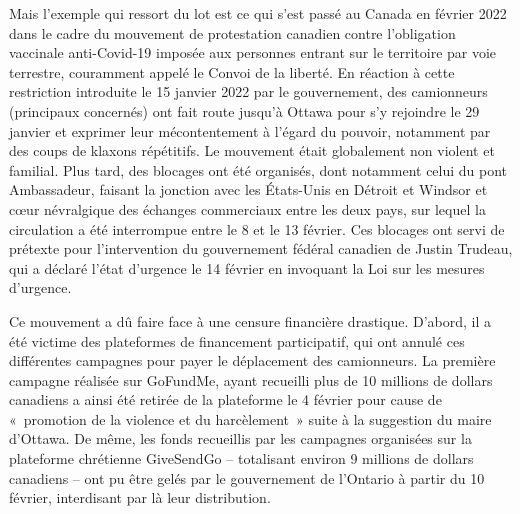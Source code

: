 Mais l'exemple qui ressort du lot est ce qui s'est passé au Canada en février 2022 dans le cadre du mouvement de protestation canadien contre l'obligation vaccinale anti-Covid-19 imposée aux personnes entrant sur le territoire par voie terrestre, couramment appelé le Convoi de la liberté. En réaction à cette restriction introduite le 15 janvier 2022 par le gouvernement, des camionneurs (principaux concernés) ont fait route jusqu'à Ottawa pour s'y rejoindre le 29 janvier et exprimer leur mécontentement à l'égard du pouvoir, notamment par des coups de klaxons répétitifs. Le mouvement était globalement non violent et familial. Plus tard, des blocages ont été organisés, dont notamment celui du pont Ambassadeur, faisant la jonction avec les États-Unis en Détroit et Windsor et cœur névralgique des échanges commerciaux entre les deux pays, sur lequel la circulation a été interrompue entre le 8 et le 13 février. Ces blocages ont servi de prétexte pour l'intervention du gouvernement fédéral canadien de Justin Trudeau, qui a déclaré l'état d'urgence le 14 février en invoquant la Loi sur les mesures d'urgence.

Ce mouvement a dû faire face à une censure financière drastique. D'abord, il a été victime des plateformes de financement participatif, qui ont annulé ces différentes campagnes pour payer le déplacement des camionneurs. La première campagne réalisée sur GoFundMe, ayant recueilli plus de 10 millions de dollars canadiens a ainsi été retirée de la plateforme le 4 février pour cause de «~promotion de la violence et du harcèlement~» suite à la suggestion du maire d'Ottawa. De même, les fonds recueillis par les campagnes organisées sur la plateforme chrétienne GiveSendGo -- totalisant environ 9 millions de dollars canadiens -- ont pu être gelés par le gouvernement de l'Ontario à partir du 10 février, interdisant par là leur distribution.

